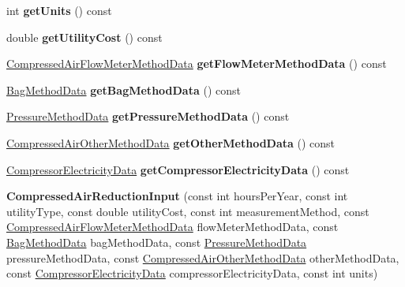 \begin{DoxyCompactItemize}
int {\bfseries get\+Units} () const
\item 
\mbox{\label{class_compressed_air_reduction_input_a53503e7e8b40c79144100e7e23a029d1}} 
double {\bfseries get\+Utility\+Cost} () const
\item 
\mbox{\label{class_compressed_air_reduction_input_a86a26c458e9d31bb212e341ced01573b}} 
\hyperlink{class_compressed_air_flow_meter_method_data}{Compressed\+Air\+Flow\+Meter\+Method\+Data} {\bfseries get\+Flow\+Meter\+Method\+Data} () const
\item 
\mbox{\label{class_compressed_air_reduction_input_ab781dbcec839e6b8a88de77ab8b0773f}} 
\hyperlink{class_bag_method_data}{Bag\+Method\+Data} {\bfseries get\+Bag\+Method\+Data} () const
\item 
\mbox{\label{class_compressed_air_reduction_input_af2fb0dba0ce5b923800eaea5545c2b1c}} 
\hyperlink{class_pressure_method_data}{Pressure\+Method\+Data} {\bfseries get\+Pressure\+Method\+Data} () const
\item 
\mbox{\label{class_compressed_air_reduction_input_a99e59b1df80be318f98140e62368fee7}} 
\hyperlink{class_compressed_air_other_method_data}{Compressed\+Air\+Other\+Method\+Data} {\bfseries get\+Other\+Method\+Data} () const
\item 
\mbox{\label{class_compressed_air_reduction_input_a17e939dbbe29dc285967a0e34cb4b113}} 
\hyperlink{class_compressor_electricity_data}{Compressor\+Electricity\+Data} {\bfseries get\+Compressor\+Electricity\+Data} () const
\item 
\mbox{\label{class_compressed_air_reduction_input_ab77e29031a9683a8842612ac55868bf0}} 
{\bfseries Compressed\+Air\+Reduction\+Input} (const int hours\+Per\+Year, const int utility\+Type, const double utility\+Cost, const int measurement\+Method, const \hyperlink{class_compressed_air_flow_meter_method_data}{Compressed\+Air\+Flow\+Meter\+Method\+Data} flow\+Meter\+Method\+Data, const \hyperlink{class_bag_method_data}{Bag\+Method\+Data} bag\+Method\+Data, const \hyperlink{class_pressure_method_data}{Pressure\+Method\+Data} pressure\+Method\+Data, const \hyperlink{class_compressed_air_other_method_data}{Compressed\+Air\+Other\+Method\+Data} other\+Method\+Data, const \hyperlink{class_compressor_electricity_data}{Compressor\+Electricity\+Data} compressor\+Electricity\+Data, const int units)

\end{DoxyCompactItemize}
